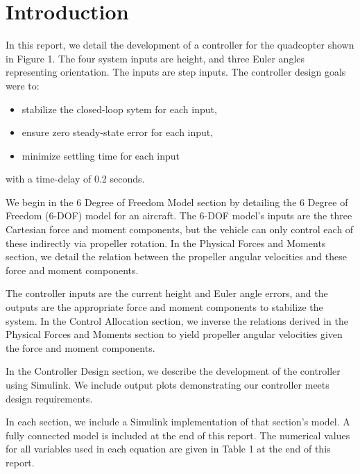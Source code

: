 \section*{Introduction}

In this report, we detail the development of a controller for the quadcopter shown in Figure 1. The four system inputs are height, and three Euler angles representing orientation. The inputs are step inputs. The controller design goals were to:
\begin{itemize}
    \item stabilize the closed-loop sytem for each input,
    \item ensure zero steady-state error for each input,
    \item minimize settling time for each input
\end{itemize}
with a time-delay of 0.2 seconds.

We begin in the 6 Degree of Freedom Model section by detailing the 6 Degree of Freedom (6-DOF) model for an aircraft. The 6-DOF model's inputs are the three Cartesian force and moment components, but the vehicle can only control each of these indirectly via propeller rotation. In the Physical Forces and Moments section, we detail the relation between the propeller angular velocities and these force and moment components.

The controller inputs are the current height and Euler angle errors, and the outputs are the appropriate force and moment components to stabilize the system. In the Control Allocation section, we inverse the relations derived in the Physical Forces and Moments section to yield propeller angular velocities given the force and moment components.

In the Controller Design section, we describe the development of the controller using Simulink. We include output plots demonstrating our controller meets design requirements.

In each section, we include a Simulink implementation of that section's model. A fully connected model is included at the end of this report. The numerical values for all variables used in each equation are given in Table 1 at the end of this report.